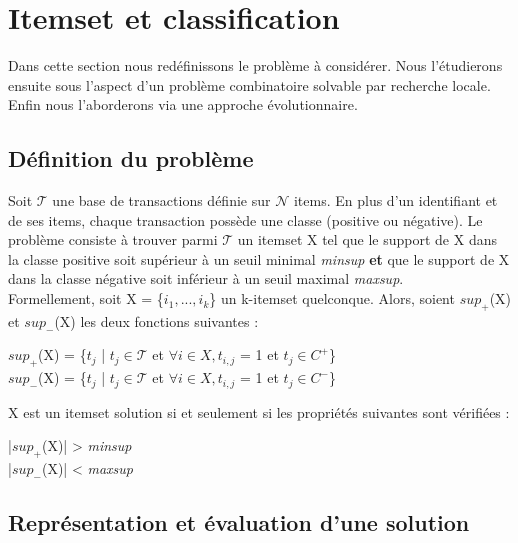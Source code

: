 \documentclass[a4paper,10pt]{report}
\begin{document}
\newpage

\section{Itemset et classification}

	Dans cette section nous redéfinissons le problème à considérer. Nous l'étudierons ensuite sous l'aspect d'un problème combinatoire solvable par recherche locale. Enfin nous l'aborderons via une approche évolutionnaire. \\

\subsection{Définition du problème}
	Soit $\mathcal{T}$ une base de transactions définie sur $\mathcal{N}$ items. En plus d'un identifiant et de ses items, chaque transaction possède une classe (positive ou négative). Le problème consiste à trouver parmi $\mathcal{T}$ un itemset X tel que le support de X dans la classe positive soit supérieur à un seuil minimal \emph{minsup} \textbf{et} que le support de X dans la classe négative soit inférieur à un seuil maximal \emph{maxsup}. \\

	Formellement, soit X = \{$i_{1}, ..., i_{k}$\} un k-itemset quelconque. Alors, soient \textbf{$sup_{+}$}(X) et \textbf{$sup_{-}$}(X) les deux fonctions suivantes : 
\begin{center}
\textbf{$sup_{+}$}(X) = \{$t_{j}$ | $t_{j} \in \mathcal{T}$ et $\forall i \in X,  t_{i,j}$ = 1 et $t_{j} \in C^{+}$\}\\ 
\textbf{$sup_{-}$}(X) = \{$t_{j}$ | $t_{j} \in \mathcal{T}$ et $\forall i \in X,  t_{i,j}$ = 1 et $t_{j} \in C^{-}$\}\\ 
\end{center}
X est un itemset solution si et seulement si les propriétés suivantes sont vérifiées : 
\begin{center}
|\textbf{$sup_{+}$}(X)| > \emph{minsup}\\
|\textbf{$sup_{-}$}(X)| < \emph{maxsup}\\
\end{center}


\subsection{Représentation et évaluation d'une solution}
\end{document}
